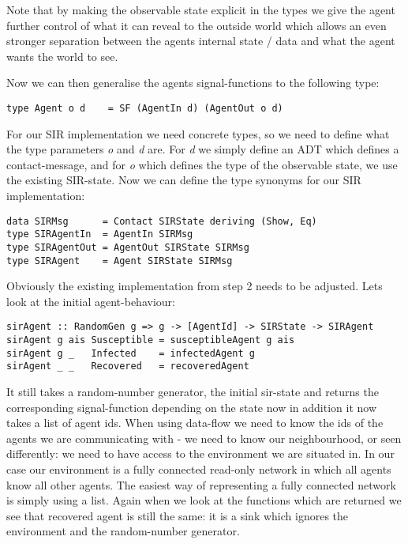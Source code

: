 Note that by making the observable state explicit in the types we give the agent further control of what it can reveal to the outside world which allows an even stronger separation between the agents internal state / data and what the agent wants the world to see.

Now we can then generalise the agents signal-functions to the following type:
\begin{verbatim}
type Agent o d    = SF (AgentIn d) (AgentOut o d)
\end{verbatim}

For our SIR implementation we need concrete types, so we need to define what the type parameters \textit{o} and \textit{d} are. For \textit{d} we simply define an ADT which defines a contact-message, and for \textit{o} which defines the type of the observable state, we use the existing SIR-state. Now we can define the type synonyms for our SIR implementation:
\begin{verbatim}
data SIRMsg      = Contact SIRState deriving (Show, Eq)
type SIRAgentIn  = AgentIn SIRMsg
type SIRAgentOut = AgentOut SIRState SIRMsg
type SIRAgent    = Agent SIRState SIRMsg
\end{verbatim}

Obviously the existing implementation from step 2 needs to be adjusted. Lets look at the initial agent-behaviour:

\begin{verbatim}
sirAgent :: RandomGen g => g -> [AgentId] -> SIRState -> SIRAgent
sirAgent g ais Susceptible = susceptibleAgent g ais
sirAgent g _   Infected    = infectedAgent g
sirAgent _ _   Recovered   = recoveredAgent
\end{verbatim}

It still takes a random-number generator, the initial sir-state and returns the corresponding signal-function depending on the state now in addition it now takes a list of agent ids. When using data-flow we need to know the ids of the agents we are communicating with - we need to know our neighbourhood, or seen differently: we need to have access to the environment we are situated in. In our case our environment is a fully connected read-only network in which all agents know all other agents. The easiest way of representing a fully connected network is simply using a list.
Again when we look at the functions which are returned we see that recovered agent is still the same: it is a sink which ignores the environment and the random-number generator. 

